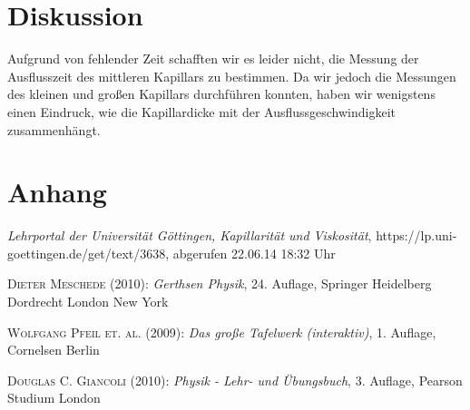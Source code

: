 \documentclass[12pt,a4paper,titlepage,headinclude,bibtotoc]{scrartcl}
\begin{document}
\section{Diskussion}
\label{sec:diskussion}
Aufgrund von fehlender Zeit schafften wir es leider nicht, die Messung der Ausflusszeit des mittleren Kapillars zu bestimmen.
Da wir jedoch die Messungen des kleinen und großen Kapillars durchführen konnten, haben wir wenigstens einen Eindruck, wie die Kapillardicke mit der Ausflussgeschwindigkeit zusammenhängt.

\section{Anhang}
\begin{thebibliography}{9}

	\emph{Lehrportal der Universität Göttingen, Kapillarität und Viskosität},
  https://lp.uni-goettingen.de/get/text/3638, abgerufen 22.06.14 18:32 Uhr

	\textsc{Dieter Meschede} (2010): \emph{Gerthsen Physik}, 24. Auflage, Springer Heidelberg
Dordrecht London New York

	\textsc{Wolfgang Pfeil et. al.} (2009): \emph{Das große Tafelwerk (interaktiv)}, 1. Auflage, Cornelsen Berlin

	\textsc{Douglas C. Giancoli} (2010): \emph{Physik - Lehr- und Übungsbuch}, 3. Auflage, Pearson Studium London
\end{thebibliography}
\end{document}
